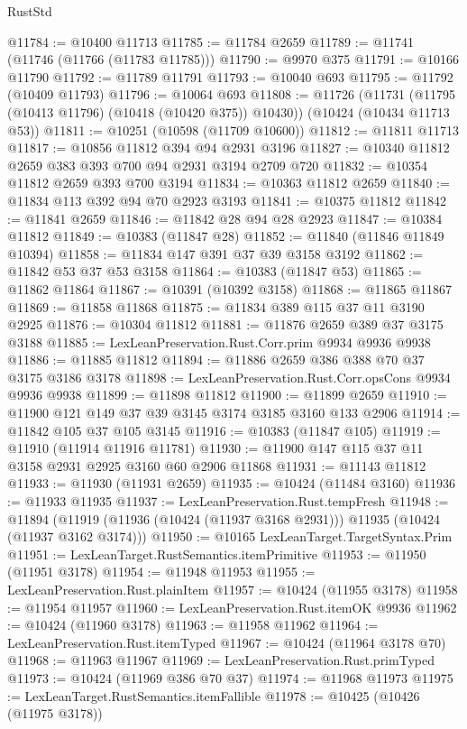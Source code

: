 \begin{lexlean}{RustStd}
\begin{coremodule}
@11784 := @10400 @11713
@11785 := @11784 @2659
@11789 := @11741 (@11746 (@11766 (@11783 @11785)))
@11790 := @9970 @375
@11791 := @10166 @11790
@11792 := @11789 @11791
@11793 := @10040 @693
@11795 := @11792 (@10409 @11793)
@11796 := @10064 @693
@11808 := @11726
    (@11731 (@11795 (@10413 @11796) (@10418 (@10420 @375)) @10430))
    (@10424 (@10434 @11713 @53))
@11811 := @10251 (@10598 (@11709 @10600))
@11812 := @11811 @11713
@11817 := @10856 @11812 @394 @94 @2931 @3196
@11827 := @10340 @11812 @2659 @383 @393 @700 @94 @2931 @3194 @2709 @720
@11832 := @10354 @11812 @2659 @393 @700 @3194
@11834 := @10363 @11812 @2659
@11840 := @11834 @113 @392 @94 @70 @2923 @3193
@11841 := @10375 @11812
@11842 := @11841 @2659
@11846 := @11842 @28 @94 @28 @2923
@11847 := @10384 @11812
@11849 := @10383 (@11847 @28)
@11852 := @11840 (@11846 @11849 @10394)
@11858 := @11834 @147 @391 @37 @39 @3158 @3192
@11862 := @11842 @53 @37 @53 @3158
@11864 := @10383 (@11847 @53)
@11865 := @11862 @11864
@11867 := @10391 (@10392 @3158)
@11868 := @11865 @11867
@11869 := @11858 @11868
@11875 := @11834 @389 @115 @37 @11 @3190 @2925
@11876 := @10304 @11812
@11881 := @11876 @2659 @389 @37 @3175 @3188
@11885 := LexLeanPreservation.Rust.Corr.prim @9934 @9936 @9938
@11886 := @11885 @11812
@11894 := @11886 @2659 @386 @388 @70 @37 @3175 @3186 @3178
@11898 := LexLeanPreservation.Rust.Corr.opsCons @9934 @9936 @9938
@11899 := @11898 @11812
@11900 := @11899 @2659
@11910 := @11900 @121 @149 @37 @39 @3145 @3174 @3185 @3160 @133 @2906
@11914 := @11842 @105 @37 @105 @3145
@11916 := @10383 (@11847 @105)
@11919 := @11910 (@11914 @11916 @11781)
@11930 := @11900 @147 @115 @37 @11 @3158 @2931 @2925 @3160 @60 @2906 @11868
@11931 := @11143 @11812
@11933 := @11930 (@11931 @2659)
@11935 := @10424 (@11484 @3160)
@11936 := @11933 @11935
@11937 := LexLeanPreservation.Rust.tempFresh
@11948 := @11894
    (@11919 (@11936 (@10424 (@11937 @3168 @2931))) @11935 (@10424 (@11937 @3162 @3174)))
@11950 := @10165 LexLeanTarget.TargetSyntax.Prim
@11951 := LexLeanTarget.RustSemantics.itemPrimitive
@11953 := @11950 (@11951 @3178)
@11954 := @11948 @11953
@11955 := LexLeanPreservation.Rust.plainItem
@11957 := @10424 (@11955 @3178)
@11958 := @11954 @11957
@11960 := LexLeanPreservation.Rust.itemOK @9936
@11962 := @10424 (@11960 @3178)
@11963 := @11958 @11962
@11964 := LexLeanPreservation.Rust.itemTyped
@11967 := @10424 (@11964 @3178 @70)
@11968 := @11963 @11967
@11969 := LexLeanPreservation.Rust.primTyped
@11973 := @10424 (@11969 @386 @70 @37)
@11974 := @11968 @11973
@11975 := LexLeanTarget.RustSemantics.itemFallible
@11978 := @10425 (@10426 (@11975 @3178))

\end{coremodule}
\end{lexlean}

